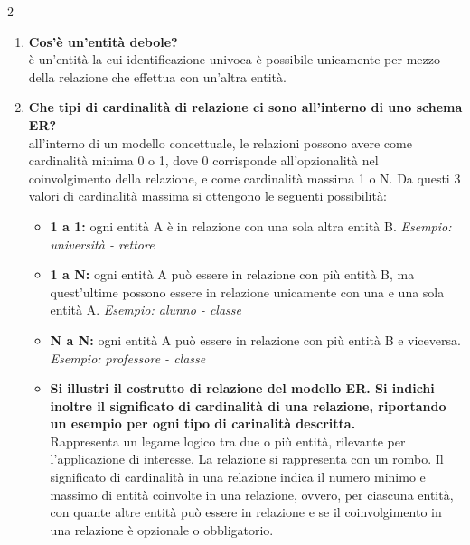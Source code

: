 \documentclass{article}
\newcounter{esempio}
\begin{document}
\begin{multicols}{2}
\begin{enumerate}[leftmargin=*, align=left]
	\item \textbf{Cos'è un'entità debole?} \\
	è un'entità la cui identificazione univoca è possibile unicamente per mezzo della relazione che effettua con un'altra entità.
	
	\item \textbf{Che tipi di cardinalità di relazione ci sono all'interno di uno schema ER?}\\
	 all'interno di un modello concettuale, le relazioni possono avere come cardinalità minima 0 o 1, dove 0 corrisponde all'opzionalità nel coinvolgimento della relazione, e come cardinalità massima 1 o N. Da questi 3 valori di cardinalità massima si ottengono le seguenti possibilità:\begin{itemize}
		\item \textbf{1 a 1:} ogni entità A è in relazione con una sola altra entità B. \textit{Esempio: università - rettore}
		\item \textbf{1 a N:} ogni entità A può essere in relazione con più entità B, ma quest'ultime possono essere in relazione unicamente con una e una sola entità A. \textit{Esempio: alunno - classe}
		\item \textbf{N a N:} ogni entità A può essere in relazione con più entità B e viceversa. \textit{Esempio: professore - classe}
		
		\item \textbf{Si illustri il costrutto di relazione del modello ER. Si indichi inoltre il significato di cardinalità di una relazione, riportando un esempio per ogni tipo di carinalità descritta.}\\
		Rappresenta un legame logico tra due o più entità, rilevante per l'applicazione di interesse. La relazione si rappresenta con un rombo. Il significato di cardinalità in una relazione indica il numero minimo e massimo di entità coinvolte in una relazione, ovvero, per ciascuna entità, con quante altre entità può essere in relazione e se il coinvolgimento in una relazione è opzionale o obbligatorio.
		
		
	\end{itemize}
	\end{enumerate}
	
	
\end{multicols}
\end{document}
